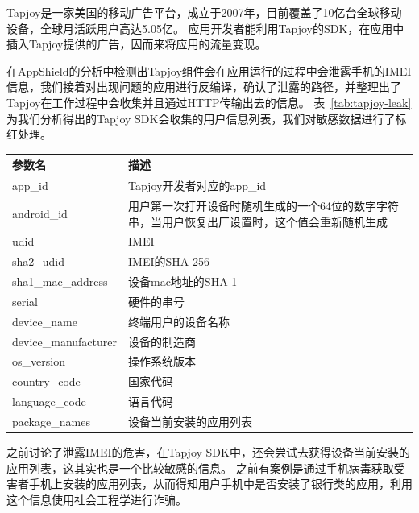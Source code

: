 Tapjoy是一家美国的移动广告平台，成立于2007年，目前覆盖了10亿台全球移动设备，全球月活跃用户高达5.05亿。
应用开发者能利用Tapjoy的SDK，在应用中插入Tapjoy提供的广告，因而来将应用的流量变现。

在AppShield的分析中检测出Tapjoy组件会在应用运行的过程中会泄露手机的IMEI信息，我们接着对出现问题的应用进行反编译，确认了泄露的路径，并整理出了Tapjoy在工作过程中会收集并且通过HTTP传输出去的信息。
表~\ref{tab:tapjoy-leak}为我们分析得出的Tapjoy SDK会收集的用户信息列表，我们对敏感数据进行了标红处理。

\begin{table}
	\centering
	\begin{tabularx}{\textwidth}{|l|X|}
		\hline
		参数名 & 描述\\
		\hline
		app\_id & Tapjoy开发者对应的app\_id\\
		\hline
		android\_id & 用户第一次打开设备时随机生成的一个64位的数字字符串，当用户恢复出厂设置时，这个值会重新随机生成\\
		\hline
		{\color{red}udid} & IMEI\\
		\hline
		sha2\_udid & IMEI的SHA-256\\
		\hline
		sha1\_mac\_address & 设备mac地址的SHA-1\\
		\hline
		serial & 硬件的串号\\
		\hline
		device\_name & 终端用户的设备名称\\
		\hline
		device\_manufacturer & 设备的制造商\\
		\hline
		os\_version & 操作系统版本\\
		\hline
		country\_code & 国家代码\\
		\hline
		language\_code & 语言代码\\
		\hline
		{\color{red}package\_names} & 设备当前安装的应用列表\\
		\hline
	\end{tabularx}
\end{table}


之前讨论了泄露IMEI的危害，在Tapjoy SDK中，还会尝试去获得设备当前安装的应用列表，这其实也是一个比较敏感的信息。
之前有案例是通过手机病毒获取受害者手机上安装的应用列表，从而得知用户手机中是否安装了银行类的应用，利用这个信息使用社会工程学进行诈骗。


